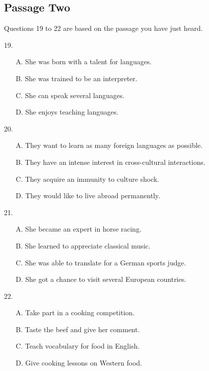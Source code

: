 \documentclass[UTF8,11pt]{ctexart}
\begin{document}
\subsection*{Passage Two}


Questions 19 to 22 are based on the passage you have just heard.


19.


\begin{itemize}[leftmargin=2em,itemsep=.2em,topsep=.4em]\item[A.] She was born with a talent for languages.
\item[B.] She was trained to be an interpreter.
\item[C.] She can speak several languages.
\item[D.] She enjoys teaching languages.
\end{itemize}

20.


\begin{itemize}[leftmargin=2em,itemsep=.2em,topsep=.4em]\item[A.] They want to learn as many foreign languages as possible.
\item[B.] They have an intense interest in cross-cultural interactions.
\item[C.] They acquire an immunity to culture shock.
\item[D.] They would like to live abroad permanently.
\end{itemize}

21.


\begin{itemize}[leftmargin=2em,itemsep=.2em,topsep=.4em]\item[A.] She became an expert in horse racing.
\item[B.] She learned to appreciate classical music.
\item[C.] She was able to translate for a German sports judge.
\end{itemize}

\begin{itemize}[leftmargin=2em,itemsep=.2em,topsep=.4em]\item[D.] She got a chance to visit several European countries.
\end{itemize}

22.


\begin{itemize}[leftmargin=2em,itemsep=.2em,topsep=.4em]\item[A.] Take part in a cooking competition.
\item[B.] Taste the beef and give her comment.
\item[C.] Teach vocabulary for food in English.
\item[D.] Give cooking lessons on Western food.
\end{itemize}
\end{document}
